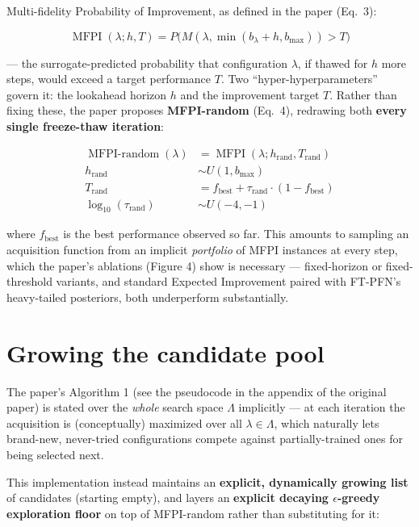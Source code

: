 \documentclass[10pt]{article}
\begin{document}
Multi-fidelity Probability of Improvement, as defined in the paper (Eq.\ 3):

\begin{equation}
\operatorname{MFPI}(\lambda; h, T) = P\big( M(\lambda, \min(b_\lambda + h, b_{\max})) > T \big)
\end{equation}

--- the surrogate-predicted probability that configuration $\lambda$, if thawed for $h$ more
steps, would exceed a target performance $T$. Two ``hyper-hyperparameters'' govern it: the
lookahead horizon $h$ and the improvement target $T$. Rather than fixing these, the paper
proposes \textbf{MFPI-random} (Eq.\ 4), redrawing both \textbf{every single freeze-thaw iteration}:

\begin{align}
\operatorname{MFPI\text{-}random}(\lambda) &= \operatorname{MFPI}(\lambda; h_\text{rand}, T_\text{rand}) \\
h_\text{rand}        &\sim U(1, b_{\max}) \\
T_\text{rand}        &= f_\text{best} + \tau_\text{rand} \cdot (1 - f_\text{best}) \\
\log_{10}(\tau_\text{rand}) &\sim U(-4, -1)
\end{align}

where $f_\text{best}$ is the best performance observed so far. This amounts to sampling an
acquisition function from an implicit \emph{portfolio} of MFPI instances at every step,
which the paper's ablations (Figure 4) show is necessary --- fixed-horizon or
fixed-threshold variants, and standard Expected Improvement paired with FT-PFN's
heavy-tailed posteriors, both underperform substantially.

\section*{Growing the candidate pool}

The paper's Algorithm 1 (see the pseudocode in the appendix of the original paper) is stated over the \emph{whole} search
space $\Lambda$ implicitly --- at each iteration the acquisition is (conceptually) maximized over
all $\lambda \in \Lambda$, which naturally lets brand-new, never-tried configurations compete against
partially-trained ones for being selected next.

This implementation instead maintains an \textbf{explicit, dynamically growing list} of candidates
(starting empty), and layers an \textbf{explicit decaying $\epsilon$-greedy exploration floor} on top
of MFPI-random rather than substituting for it:
\end{document}
